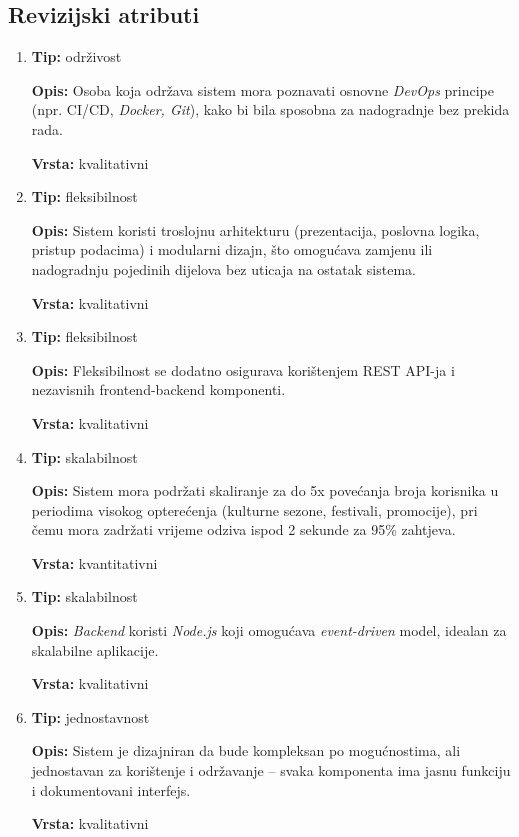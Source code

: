 \sloppy
\subsection{Revizijski atributi}

\begin{enumerate}
    \item\textbf{Tip:} održivost

    
    \textbf{Opis:} Osoba koja održava sistem mora poznavati osnovne \textit{DevOps} principe (npr. CI/CD, \textit{Docker, Git}), kako bi bila sposobna za nadogradnje bez prekida rada.

    
    \textbf{Vrsta:} kvalitativni
    \item\textbf{Tip:} fleksibilnost

    
    \textbf{Opis:} Sistem koristi troslojnu arhitekturu (prezentacija, poslovna logika, pristup podacima) i modularni dizajn, što omogućava zamjenu ili nadogradnju pojedinih dijelova bez uticaja na ostatak sistema.

    
    \textbf{Vrsta:} kvalitativni
    \item\textbf{Tip:} fleksibilnost

    
    \textbf{Opis:} Fleksibilnost se dodatno osigurava korištenjem REST API-ja i nezavisnih frontend-backend komponenti.

    
    \textbf{Vrsta:} kvalitativni
    \item\textbf{Tip:} skalabilnost

    
    \textbf{Opis:} Sistem mora podržati skaliranje za do 5x povećanja broja korisnika u periodima visokog opterećenja (kulturne sezone, festivali, promocije), pri čemu mora zadržati vrijeme odziva ispod 2 sekunde za 95\% zahtjeva.

    
    \textbf{Vrsta:} kvantitativni
    \item\textbf{Tip:} skalabilnost

    
    \textbf{Opis:} \textit{Backend} koristi \textit{Node.js} koji omogućava \textit{event-driven }model, idealan za skalabilne aplikacije.

    
    \textbf{Vrsta:} kvalitativni
    \item\textbf{Tip:} jednostavnost

    
    \textbf{Opis:} Sistem je dizajniran da bude kompleksan po mogućnostima, ali jednostavan za korištenje i održavanje – svaka komponenta ima jasnu funkciju i dokumentovani interfejs.

    
    \textbf{Vrsta:} kvalitativni
\end{enumerate}

